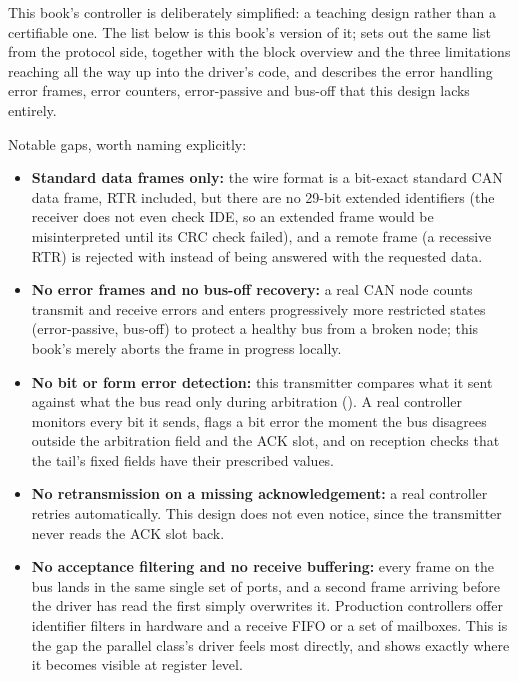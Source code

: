 This book's controller is deliberately simplified: a teaching design rather than a certifiable one.
The list below is this book's version of it;  sets out the same list from the protocol side,
together with the block overview and the three limitations reaching all the way up into the driver's
code, and  describes the error handling \textemdash{} error frames, error counters,
error-passive and bus-off \textemdash{} that this design lacks entirely.

Notable gaps, worth naming explicitly:
\begin{itemize}
  \item \textbf{Standard data frames only:} the wire format is a bit-exact standard CAN data frame,
    RTR included, but there are no 29-bit extended identifiers (the receiver does not even check IDE,
    so an extended frame would be misinterpreted until its CRC check failed), and a remote frame (a
    recessive RTR) is rejected with  instead of being answered with the requested data.
  \item \textbf{No error frames and no bus-off recovery:} a real CAN node counts transmit and receive
    errors and enters progressively more restricted states (error-passive, bus-off) to protect a
    healthy bus from a broken node; this book's  merely aborts the frame in
    progress locally.
  \item \textbf{No bit or form error detection:} this transmitter compares what it sent against what
    the bus read only during arbitration (). A real controller monitors every bit it
    sends, flags a bit error the moment the bus disagrees outside the arbitration field and the ACK
    slot, and on reception checks that the tail's fixed fields have their prescribed values.
  \item \textbf{No retransmission on a missing acknowledgement:} a real controller retries
    automatically. This design does not even notice, since the transmitter never reads the ACK slot
    back.
  \item \textbf{No acceptance filtering and no receive buffering:} every frame on the bus lands in the
    same single set of  ports, and a second frame arriving before the driver has read the
    first simply overwrites it. Production controllers offer identifier filters in hardware and a
    receive FIFO or a set of mailboxes. This is the gap the parallel class's driver feels most
    directly, and  shows exactly where it becomes visible at register level.

\end{itemize}
